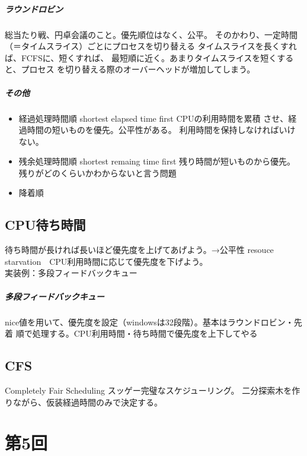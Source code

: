 \documentclass{jsarticle}
\begin{document}
\subparagraph{ラウンドロビン}
総当たり戦、円卓会議のこと。優先順位はなく、公平。
そのかわり、一定時間（＝タイムスライス）ごとにプロセスを切り替える
タイムスライスを長くすれば、FCFSに、短くすれば、
最短順に近く。あまりタイムスライスを短くすると、プロセス
を切り替える際のオーバーヘッドが増加してしまう。
\subparagraph{その他}
\begin{itemize}
  \item 経過処理時間順
  shortest elapsed time first CPUの利用時間を累積
  させ、経過時間の短いものを優先。公平性がある。
  利用時間を保持しなければいけない。
  \item 残余処理時間順
  shortest remaing time first 残り時間が短いものから優先。
  残りがどのくらいかわからないと言う問題
  \item 降着順
\end{itemize}
\subsection{CPU待ち時間}
待ち時間が長ければ長いほど優先度を上げてあげよう。→公平性
resouce starvation　CPU利用時間に応じて優先度を下げよう。\\
実装例：多段フィードバックキュー
\subparagraph{多段フィードバックキュー}
nice値を用いて、優先度を設定（windowsは32段階）。基本はラウンドロビン・先着
順で処理する。CPU利用時間・待ち時間で優先度を上下してやる
\subsection{CFS}
Completely Fair Scheduling スッゲー完璧なスケジューリング。
二分探索木を作りながら、仮装経過時間のみで決定する。

\section{第5回}
\end{document}
